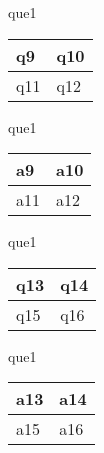 \documentclass[13.5pt, varwidth=true]{beamer}
\begin{document}
\begin{frame}[shrink=19,fragile]
	\begin{beamercolorbox}[rounded=true, left, shadow=true,wd=14.8cm]{que1}
		\begin{tabular}{p{7cm} | p{7cm}}
			\parbox{7cm}{q9 } & \parbox{7cm}{q10 } \\ 
			\hline
			\parbox{7cm}{q11 } & \parbox{7cm}{q12 } \\
		\end{tabular}
	\end{beamercolorbox}
\end{frame}
\begin{frame}[shrink=19,fragile]
	\begin{beamercolorbox}[rounded=true, left, shadow=true,wd=14.8cm]{que1}
		\begin{tabular}{p{7cm} | p{7cm}}
			\textcolor{ared}{a9 }  & \textcolor{ared}{a10 } \\ 
			\hline
			\textcolor{ared}{a11 }  & \textcolor{ared}{a12 } \\
		\end{tabular}
	\end{beamercolorbox}
\end{frame}

\begin{frame}[shrink=19,fragile]
	\begin{beamercolorbox}[rounded=true, left, shadow=true,wd=14.8cm]{que1}
		\begin{tabular}{p{7cm} | p{7cm}}
			\parbox{7cm}{q13 } & \parbox{7cm}{q14 } \\ 
			\hline
			\parbox{7cm}{q15 } & \parbox{7cm}{q16 } \\
		\end{tabular}
	\end{beamercolorbox}
\end{frame}
\begin{frame}[shrink=19,fragile]
	\begin{beamercolorbox}[rounded=true, left, shadow=true,wd=14.8cm]{que1}
		\begin{tabular}{p{7cm} | p{7cm}}
			\textcolor{ared}{a13 }  & \textcolor{ared}{a14 } \\ 
			\hline
			\textcolor{ared}{a15 }  & \textcolor{ared}{a16 } \\
		\end{tabular}
	\end{beamercolorbox}
\end{frame}
\end{document}
